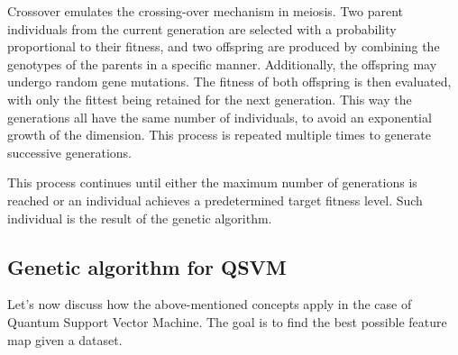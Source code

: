 \documentclass[12pt]{article}
\begin{document}
Crossover emulates the crossing-over mechanism in meiosis. Two parent individuals from the current generation are selected with a probability proportional to their fitness, and two offspring are produced by combining the genotypes of the parents in a specific manner. Additionally, the offspring may undergo random gene mutations. The fitness of both offspring is then evaluated, with only the fittest being retained for the next generation. This way the generations all have the same number of individuals, to avoid an exponential growth of the dimension. This process is repeated multiple times to generate successive generations.

This process continues until either the maximum number of generations is reached or an individual achieves a predetermined target fitness level. Such individual is the result of the genetic algorithm. 

\subsection{Genetic algorithm for QSVM}





Let's now discuss how the above-mentioned concepts apply in the case of Quantum Support Vector Machine. The goal is to find the best possible feature map given a dataset. 
\end{document}
